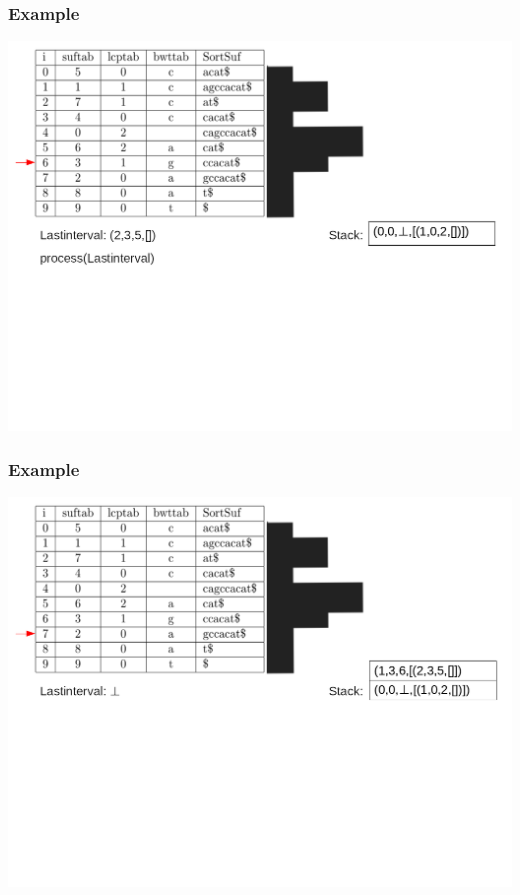 \documentclass[compress,handout]{beamer} %
\begin{document}
\begin{frame}
	\frametitle{Example}
	\includegraphics[width=\textwidth, height=\textheight, keepaspectratio=true]{traversal_10}
\end{frame}

\begin{frame}
	\frametitle{Example}
	\includegraphics[width=\textwidth, height=\textheight, keepaspectratio=true]{traversal_11}
\end{frame}
\end{document}
